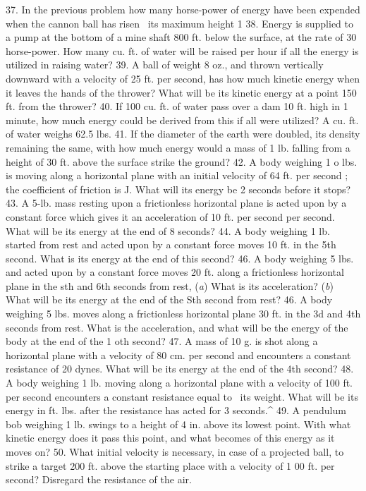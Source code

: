 37. In the previous problem how many horse-power of energy have been expended when the cannon ball has risen \ its maximum height 1
38. Energy is supplied to a pump at the bottom of a mine shaft 800 ft. below the surface, at the rate of 30 horse-power. How many cu. ft. of water will be raised per hour if all the energy is utilized in raising water?
39. A ball of weight 8 oz., and thrown vertically downward with a velocity of 25 ft. per second, has how much kinetic energy when it leaves the hands of the thrower? What will be its kinetic energy at a point 150 ft. from the thrower?
40. If 100 cu. ft. of water pass over a dam 10 ft. high in 1 minute, how much energy could be derived from this if all were utilized? A cu. ft. of water weighs 62.5 lbs.
41. If the diameter of the earth were doubled, its density remaining the same, with how much energy would a mass of 1 lb. falling from a height of 30 ft. above the surface strike the ground?
42. A body weighing 1 o lbs. is moving along a horizontal plane with an initial velocity of 64 ft. per second ; the coefficient of friction is J. What will its energy be 2 seconds before it stops?
43. A 5-lb. mass resting upon a frictionless horizontal plane is acted upon by a constant force which gives it an acceleration of 10 ft. per second per second. What will be its energy at the end of 8 seconds?
44. A body weighing 1 lb. started from rest and acted upon by a constant force moves 10 ft. in the 5th second. What is its energy at the end of this second?
46. A body weighing 5 lbs. and acted upon by a constant force moves 20 ft. along a frictionless horizontal plane in the sth and 6th seconds from rest, (\emph{a}) What is its acceleration? (\emph{b}) What will be its energy at the end of the Sth second from rest?
46. A body weighing 5 lbs. moves along a frictionless horizontal plane 30 ft. in the 3d and 4th seconds from rest. What is the acceleration, and what will be the energy of the body at the end of the 1 oth second?
47. A mass of 10 g. is shot along a horizontal plane with a velocity of 80 cm. per second and encounters a constant resistance of 20 dynes. What will be its energy at the end of the 4th second?
48. A body weighing 1 lb. moving along a horizontal plane with a velocity of 100 ft. per second encounters a constant resistance equal to \ its weight. What will be its energy in ft. lbs. after the resistance has acted for 3 seconds.^
49. A pendulum bob weighing 1 lb. swings to a height of 4 in. above its lowest point. With what kinetic energy does it pass this point, and what becomes of this energy as it moves on?
50. What initial velocity is necessary, in case of a projected ball, to strike a target 200 ft. above the starting place with a velocity of 1 00 ft. per second? Disregard the resistance of the air.
